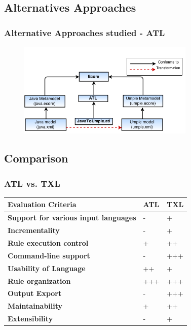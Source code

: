 \documentclass[xcolor=table]{beamer}
\begin{document}
\subsection{Alternatives Approaches} 
\begin{frame}
\frametitle{Alternative Approaches studied - ATL}
\centering
\begin{figure}[h]
\centering
\includegraphics[width=0.75\textwidth]{Figures/ATLPROGRAM.png} 
\end{figure}
\end{frame}


\subsection{Comparison} 
\begin{frame}
\frametitle{ATL vs. TXL}

\begin{table}[h]
\centering
\begin{tabular}{l|p{2cm}|p{2cm}}
\toprule
\rowcolor[HTML]{BBDAFF}
\textbf{Evaluation Criteria} & \textbf{ATL}  & \textbf{TXL}   \\ \midrule
\textbf{Support for various input languages} & - &  +  \\ \hline
\textbf{Incrementality} & - &  +  \\ \hline
\textbf{Rule execution control} & + &   ++ \\ \hline
\textbf{Command-line support} & - & +++	    \\ \hline
\textbf{Usability of Language} & ++  & +   \\ \hline
\textbf{Rule organization} & +++ &  +++  \\ \hline
\textbf{Output Export} & - &  +++  \\ \hline
\textbf{Maintainability} & + &  ++  \\ \hline
\textbf{Extensibility} & - &  +  \\ 
\bottomrule
\end{tabular}
\end{table}
\end{frame}
\end{document}
